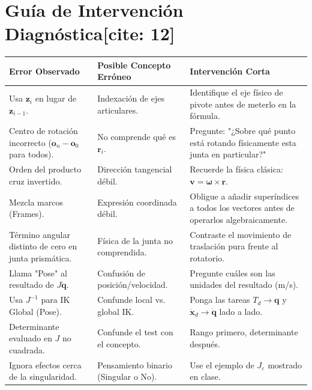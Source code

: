\documentclass[11pt, a4paper]{article}
\begin{document}
\section*{Guía de Intervención Diagnóstica[cite: 12]}
\renewcommand{\arraystretch}{1.4}
\begin{tabularx}{\textwidth}{|X|X|X|}
\hline
\rowcolor{gray!20} \textbf{Error Observado} & \textbf{Posible Concepto Erróneo} & \textbf{Intervención Corta} \\ \hline
Usa $\mathbf{z}_i$ en lugar de $\mathbf{z}_{i-1}$. & Indexación de ejes articulares. & Identifique el eje físico de pivote antes de meterlo en la fórmula. \\ \hline
Centro de rotación incorrecto ($\mathbf{o}_n - \mathbf{o}_0$ para todos). & No comprende qué es $\mathbf{r}_i$. & Pregunte: "¿Sobre qué punto está rotando físicamente esta junta en particular?" \\ \hline
Orden del producto cruz invertido. & Dirección tangencial débil. & Recuerde la física clásica: $\mathbf{v} = \boldsymbol{\omega} \times \mathbf{r}$. \\ \hline
Mezcla marcos (Frames). & Expresión coordinada débil. & Obligue a añadir superíndices a todos los vectores antes de operarlos algebraicamente. \\ \hline
Término angular distinto de cero en junta prismática. & Física de la junta no comprendida. & Contraste el movimiento de traslación pura frente al rotatorio. \\ \hline
Llama "Pose" al resultado de $J\dot{\mathbf{q}}$. & Confusión de posición/velocidad. & Pregunte cuáles son las unidades del resultado (m/s). \\ \hline
Usa $J^{-1}$ para IK Global (Pose). & Confunde local vs. global IK. & Ponga las tareas $T_d \to \mathbf{q}$ y $\dot{\mathbf{x}}_d \to \dot{\mathbf{q}}$ lado a lado. \\ \hline
Determinante evaluado en $J$ no cuadrada. & Confunde el test con el concepto. & Rango primero, determinante después. \\ \hline
Ignora efectos cerca de la singularidad. & Pensamiento binario (Singular o No). & Use el ejemplo de $J_\varepsilon$ mostrado en clase. \\ \hline
\end{tabularx}
\end{document}
